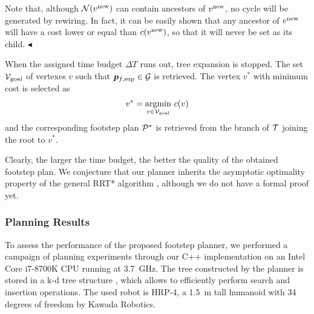 Note that, although ${\cal N} (v^{\rm new})$ can contain ancestors of $v^{\rm new}$, no cycle will be generated by rewiring.
In fact, it can be easily shown that any ancestor of $v^{\rm new}$ will have a cost lower or equal than $c(v^{\rm new})$, so that it will never be set as its child. \hfill $\blacktriangleleft$

\smallskip

When the assigned time budget ${\Delta T}$ runs out, tree expansion is stopped. The set ${\cal V}_{\rm goal}$ of vertexes $v$ such that ${\bm{p}}_{f,{\rm sup}} \in {\cal G}$ is retrieved.
The vertex $v^*$ with minimum cost is selected as
\begin{equation}
    \label{eq:BestVertex}
    v^* = \underset{v \in {\cal V}_{\rm goal}}{\arg\!\min} \ c(v)
\end{equation}
and the corresponding footstep plan ${\cal P}^*$ is retrieved from the branch of $\cal T$ joining the root to $v^*$.


Clearly, the larger the time budget, the better the quality of the obtained footstep plan. %
We conjecture that our planner inherits the asymptotic optimality property of the general RRT* algorithm \cite{KaFr:11}, although we do not have a formal proof yet.

\subsubsection{Planning Results}
\label{sec:offlineCase:FP:PlanningResults}

To assess the performance of the proposed footstep planner, we performed a campaign of planning experiments through our C++ implementation on an Intel Core i7-8700K CPU running at 3.7~GHz.
The tree constructed by the planner is stored in a k-d tree structure \cite{Yershova2007ImprovingMotionPlanning}, which allows to efficiently perform search and insertion operations.
The used robot is HRP-4, a 1.5~m tall humanoid with 34 degrees of freedom
by Kawada Robotics.




